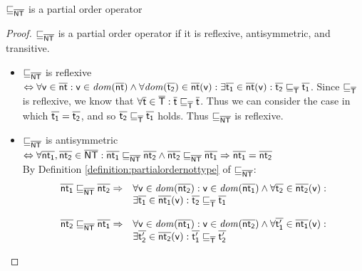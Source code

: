 \documentclass{llncs}
\begin{document}
\begin{lemma}
\label{lemma:provepartialordernottype}
$\sqsubseteq_{\mathsf{\overline{NT}}}$ is a partial order operator

\begin{proof}
$\sqsubseteq_{\mathsf{\overline{NT}}}$ is a partial order operator if it is reflexive, antisymmetric, and transitive.

\begin{itemize}
\item $\sqsubseteq_{\mathsf{\overline{NT}}}$ is reflexive $\Leftrightarrow \forall \mathsf{v} \in \mathsf{\overline{nt}} : \mathsf{v} \in \mathit{dom}(\mathsf{\overline{nt}}) \land \forall \mathit{dom}(\mathsf{\overline{t_2}}) \in \mathsf{\overline{nt}}(\mathsf{v}) : \exists \mathsf{\overline{t_1}} \in \mathsf{\overline{nt}}(\mathsf{v}) : \mathsf{\overline{t_2}} \sqsubseteq_{\mathsf{\overline{T}}} \mathsf{\overline{t_1}}$. Since $\sqsubseteq_{\mathsf{\overline{T}}}$ is reflexive, we know that $\forall \mathsf{\overline{t}} \in \mathsf{\overline{T}} : \mathsf{\overline{t}} \sqsubseteq_{\mathsf{\overline{T}}} \mathsf{\overline{t}}$. Thus we can consider the case in which $\mathsf{\overline{t_1}} = \mathsf{\overline{t_2}}$, and so $\mathsf{\overline{t_2}} \sqsubseteq_{\mathsf{\overline{T}}} \mathsf{\overline{t_1}}$ holds. Thus $\sqsubseteq_{\mathsf{\overline{NT}}}$ is reflexive.\\
\item $\sqsubseteq_{\mathsf{\overline{NT}}}$ is antisymmetric $\Leftrightarrow \forall \mathsf{\overline{nt_1}}, \mathsf{\overline{nt_2}} \in \mathsf{\overline{NT}} : \mathsf{\overline{nt_1}} \sqsubseteq_{\mathsf{\overline{NT}}} \mathsf{\overline{nt_2}} \land \mathsf{\overline{nt_2}} \sqsubseteq_{\mathsf{\overline{NT}}} \mathsf{\overline{nt_1}} \Rightarrow \mathsf{\overline{nt_1}} = \mathsf{\overline{nt_2}}$\\
By Definition \ref{definition:partialordernottype} of $\sqsubseteq_{\mathsf{\overline{NT}}}$:
\begin{equation}
\label{equation:antisymetric1}
\begin{array}{ll}
\mathsf{\overline{nt_1}} \sqsubseteq_{\mathsf{\overline{NT}}} \mathsf{\overline{nt_2}} \Rightarrow & \forall \mathsf{v} \in \mathit{dom}(\mathsf{\overline{nt_2}}) : \mathsf{v} \in \mathit{dom}(\mathsf{\overline{nt_1}}) \land \forall \mathsf{\overline{t_2}} \in \mathsf{\overline{nt_2}}(\mathsf{v}) :\\
& \exists \mathsf{\overline{t_1}} \in \mathsf{\overline{nt_1}}(\mathsf{v}) : \mathsf{\overline{t_2}} \sqsubseteq_{\mathsf{\overline{T}}} \mathsf{\overline{t_1}}
\end{array}
\end{equation}

\begin{equation}
\label{equation:antisymetric2}
\begin{array}{ll}
\mathsf{\overline{nt_2}} \sqsubseteq_{\mathsf{\overline{NT}}} \mathsf{\overline{nt_1}} \Rightarrow & \forall \mathsf{v} \in \mathit{dom}(\mathsf{\overline{nt_1}}) : \mathsf{v} \in \mathit{dom}(\mathsf{\overline{nt_2}}) \land \forall \mathsf{\overline{t'_1}} \in \mathsf{\overline{nt_1}}(\mathsf{v}) :\\
& \exists \mathsf{\overline{t'_2}} \in \mathsf{\overline{nt_2}}(\mathsf{v}) : \mathsf{\overline{t'_1}} \sqsubseteq_{\mathsf{\overline{T}}} \mathsf{\overline{t'_2}}
\end{array}
\end{equation}


\end{itemize}
\end{proof}
\end{lemma}
\end{document}
